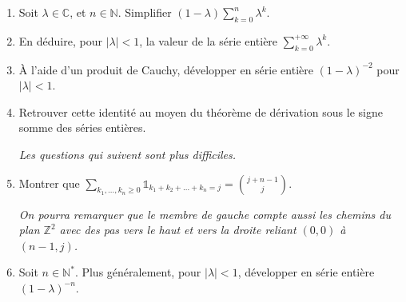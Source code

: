 
\medskip

\begin{mdframed}
\begin{exercice}
\begin{enumerate}
\item Soit $\lambda \in \mathbb{C}$, et $n \in \mathbb{N}$. Simplifier $(1 - \lambda) \sum_{k=0}^n \lambda^k$.
\item En déduire, pour $|\lambda| < 1$, la valeur de la série entière $\sum_{k=0}^{+\infty} \lambda^k$.
\item À l'aide d'un produit de Cauchy, développer en série entière $(1 - \lambda)^{-2}$ pour $|\lambda| < 1$.
\item Retrouver cette identité au moyen du théorème de dérivation sous le signe somme des séries entières.

\textit{Les questions qui suivent sont plus difficiles.}
\item Montrer que $\sum_{k_1,\dots,k_n\ge 0} \mathbb{1}_{k_1+k_2+\dots+k_n=j} = \binom{j + n - 1}{j}$.

\textit{On pourra remarquer que le membre de gauche compte aussi les chemins du plan $\mathbb{Z}^2$ avec des pas vers le haut et vers la droite reliant $(0, 0)$ à $(n - 1, j)$.}
\item Soit $n \in \mathbb{N}^*$. Plus généralement, pour $|\lambda| < 1$, développer en série entière $(1 - \lambda)^{-n}$.
\end{enumerate}
\end{exercice}
\end{mdframed}